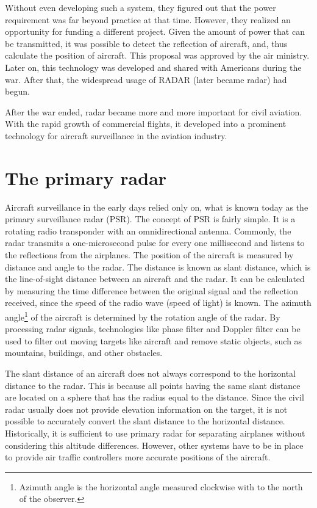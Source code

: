 Without even developing such a system, they figured out that the power requirement was far beyond practice at that time. However, they realized an opportunity for funding a different project. Given the amount of power that can be transmitted, it was possible to detect the reflection of aircraft, and, thus calculate the position of aircraft. This proposal was approved by the air ministry. Later on, this technology was developed and shared with Americans during the war. After that, the widespread usage of RADAR (later became radar) had begun.

After the war ended, radar became more and more important for civil aviation. With the rapid growth of commercial flights, it developed into a prominent technology for aircraft surveillance in the aviation industry.

\section{The primary radar}

Aircraft surveillance in the early days relied only on, what is known today as the primary surveillance radar (PSR). The concept of PSR is fairly simple. It is a rotating radio transponder with an omnidirectional antenna. Commonly, the radar transmits a one-microsecond pulse for every one millisecond and listens to the reflections from the airplanes. The position of the aircraft is measured by distance and angle to the radar. The distance is known as slant distance, which is the line-of-sight distance between an aircraft and the radar. It can be calculated by measuring the time difference between the original signal and the reflection received, since the speed of the radio wave (speed of light) is known. The azimuth angle\footnote{Azimuth angle is the horizontal angle measured clockwise with to the north of the observer.} of the aircraft is determined by the rotation angle of the radar. By processing radar signals, technologies like phase filter and Doppler filter can be used to filter out moving targets like aircraft and remove static objects, such as mountains, buildings, and other obstacles.

The slant distance of an aircraft does not always correspond to the horizontal distance to the radar. This is because all points having the same slant distance are located on a sphere that has the radius equal to the distance. Since the civil radar usually does not provide elevation information on the target, it is not possible to accurately convert the slant distance to the horizontal distance. Historically, it is sufficient to use primary radar for separating airplanes without considering this altitude differences. However, other systems have to be in place to provide air traffic controllers more accurate positions of the aircraft.

